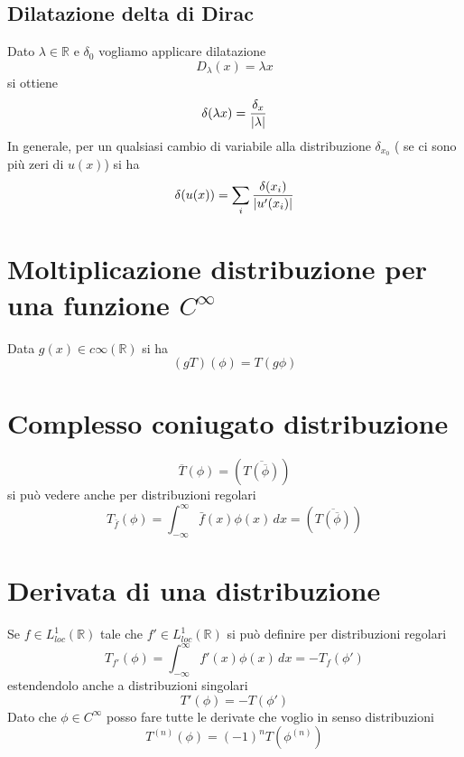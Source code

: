 \documentclass[a4paper,11pt]{report}
\theoremstyle{remark}
\theoremstyle{definition}
\newcommand{\R}{\mathbb{R}}
\DeclarePairedDelimiter{\abs}{\lvert}{\rvert}
\begin{document}
\subsection*{Dilatazione delta di Dirac}

Dato $\lambda\in\R$ e $\delta_0$ vogliamo applicare dilatazione
\begin{equation*}
	D_\lambda(x)=\lambda x 
\end{equation*}
si ottiene
\begin{equation*}
	\delta(\lambda x) = \frac{\delta_x}{\abs{\lambda}}
\end{equation*}
In generale, per un qualsiasi cambio di variabile alla distribuzione $\delta_{x_0}$ ( se ci sono più zeri di $u(x)$) si ha 
\begin{equation*}
	\delta(u(x)) = \sum_i \frac{\delta({x_i})}{\abs{u'(x_i)}}
\end{equation*}

\section{Moltiplicazione distribuzione per una funzione \texorpdfstring{$C^\infty$}{U}}

Data $g(x)\in c\infty(\R)$ si ha 
\begin{equation*}
	(gT)(\phi) = T(g\phi)
\end{equation*}

\section{Complesso coniugato distribuzione}
\begin{equation*}
	\overline{T}(\phi) = (\overline{T(\overline{\phi})})
\end{equation*}
si può vedere anche per distribuzioni regolari
\begin{equation*}
	T_{\bar{f}}(\phi) = \int_{-\infty}^\infty \bar{f}(x)\phi(x) \, dx = (\overline{T(\overline{\phi})})
\end{equation*}

\section{Derivata di una distribuzione}
Se $f\in L^1_{loc}(\R)$ tale che $f'\in L^1_{loc}(\R)$ si può definire per distribuzioni regolari
\begin{equation*}
	T_{f'}(\phi) = \int_{-\infty}^\infty f'(x)\phi(x) \, dx = -T_f(\phi')
\end{equation*}
estendendolo anche a distribuzioni singolari
\begin{equation*}
	T'(\phi) = - T(\phi')
\end{equation*}
Dato che $\phi\in C^\infty$ posso fare tutte le derivate che voglio in senso distribuzioni
\begin{equation*}
	T^{(n)}(\phi) = (-1)^n T(\phi^{(n)})
\end{equation*}
\end{document}
